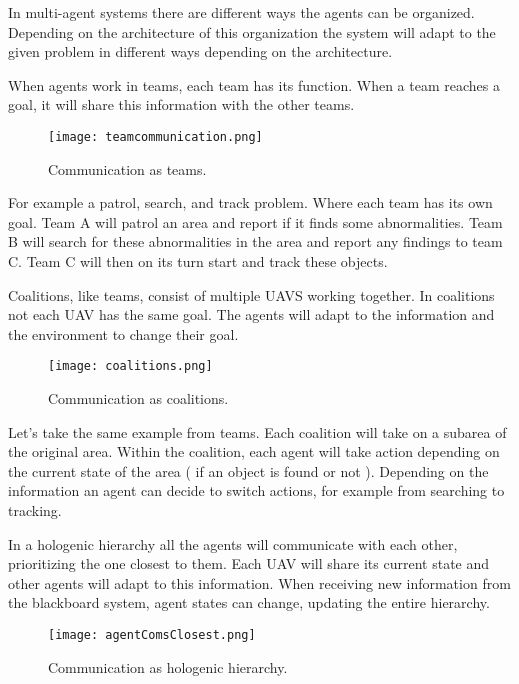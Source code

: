 
In multi-agent systems there are different ways the agents can be organized. 
Depending on the architecture of this organization the system will adapt to 
the given problem in different ways depending on the architecture. 

When agents work in teams, each team has its function. When a team reaches a goal, it will share this information with the other teams.
\begin{figure}[ht]
    \centering
    \texttt{[image: teamcommunication.png]}
    \caption[Communication as teams]{Communication as teams\footnotemark.}
\end{figure}

For example a patrol, search, and track problem. Where each team has its own goal. 
Team A will patrol an area and report if it finds some abnormalities. Team B will search for these abnormalities in the area and report any findings to team C. 
Team C will then on its turn start and track these objects.

Coalitions, like teams, consist of multiple UAVS working together. In coalitions not each UAV has the same goal. 
The agents will adapt to the information and the environment to change their goal.

\newpage

\begin{figure}[ht]
    \centering
    \texttt{[image: coalitions.png]}
    \caption[Communication as coalitions]{Communication as coalitions\footnotemark.}
\end{figure}
Let’s take the same example from teams. Each coalition will take on a subarea of the original area. Within the coalition, 
each agent will take action depending on the current state of the area ( if an object is found or not ). 
Depending on the information an agent can decide to switch actions, for example from searching to tracking.

In a hologenic hierarchy all the agents will communicate with each other, prioritizing the one closest to them. 
Each UAV will share its current state and other agents will adapt to this information. When receiving new information 
from the blackboard system, agent states can change, updating the entire hierarchy. 

\begin{figure}[ht]
    \centering
    \texttt{[image: agentComsClosest.png]}
    \caption[Communication as hologenic hierarchy]{Communication as hologenic hierarchy\footnotemark.}
\end{figure}
